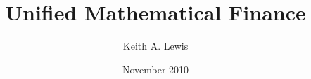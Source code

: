 \documentclass[11pt]{amsbook}
\begin{document}
 

\author{Keith A. Lewis} 
\title{Unified Mathematical Finance} 
\date{November 2010} 

% 




%
%
%
%
%
%


\backmatter 
% 
% 
\end{document}
